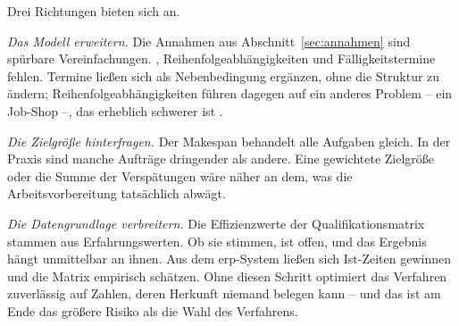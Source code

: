 Drei Richtungen bieten sich an.

\emph{Das Modell erweitern.} Die Annahmen aus
Abschnitt~\ref{sec:annahmen} sind spürbare Vereinfachungen.
, Reihenfolgeabhängigkeiten und Fälligkeitstermine
fehlen. Termine ließen sich als Nebenbedingung ergänzen, ohne die
Struktur zu ändern; Reihenfolgeabhängigkeiten führen dagegen auf ein
anderes Problem -- ein Job-Shop --, das erheblich schwerer ist
\parencite{pinedo2016scheduling}.

\emph{Die Zielgröße hinterfragen.} Der Makespan behandelt alle Aufgaben
gleich. In der Praxis sind manche Aufträge dringender als andere. Eine
gewichtete Zielgröße oder die Summe der Verspätungen wäre näher an dem,
was die Arbeitsvorbereitung tatsächlich abwägt.

\emph{Die Datengrundlage verbreitern.} Die Effizienzwerte der
Qualifikationsmatrix stammen aus Erfahrungswerten. Ob sie stimmen, ist
offen, und das Ergebnis hängt unmittelbar an ihnen. Aus dem
\ac{erp}-System ließen sich Ist-Zeiten gewinnen und die Matrix
empirisch schätzen. Ohne diesen Schritt optimiert das Verfahren
zuverlässig auf Zahlen, deren Herkunft niemand belegen kann -- und das
ist am Ende das größere Risiko als die Wahl des Verfahrens.
